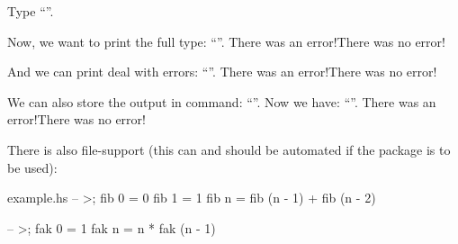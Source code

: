 \documentclass{article}
\def\errcheck{\ifhasktexlasterror There was an error!\else There was no error!\fi}
\begin{document}
Type ``''.

Now, we want to print the full type: ``''.
\errcheck

And we can print deal with errors: ``''.
\errcheck

We can also store the output in command: ``''. Now we have: ``\mycommand''.
\errcheck

There is also file-support (this can and should be automated if the package is to be used):
\begin{filecontents}{example.hs}
-- >;
fib 0 = 0
fib 1 = 1
fib n = fib (n - 1) + fib (n - 2)

-- >;
fak 0 = 1
fak n = n * fak (n - 1)
\end{filecontents}

\end{document}
